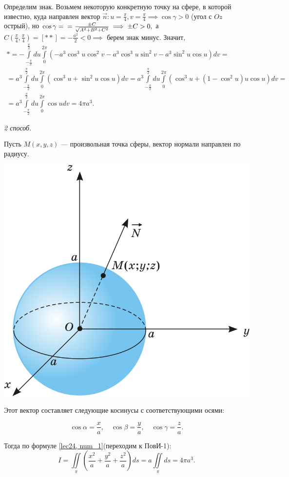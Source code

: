 \documentclass[../../main.tex]{subfiles}
\begin{document}
\begin{example}
	Определим знак. Возьмем некоторую конкретную точку на сфере, в которой 
	известно, куда направлен вектор $\vec{n}: u=\frac{\pi}{4}, v=\frac{\pi}{4}
	\implies \cos\gamma > 0$ (угол с $Oz$ острый), но $\cos\gamma =\\= 
	\frac{\pm C}{\sqrt{A^2 + B^2 + C^2}}\implies \pm C>0,$ а $C\left(\frac{\pi}
	{4}, \frac{\pi}{4}\right)=\left[**\right]=-\frac{a^2}{2}<0\implies$ берем
	 знак минус. Значит,
	\begin{multline*}*=-\int\limits_{-\frac{\pi}{2}}^{\frac{\pi}{2}}du\int
	\limits_0^{2\pi}(-a^3\cos^3 u \cos^2 v - a^3\cos^3 u \sin^2 v - a^3\sin^2
	 u \cos u)dv =\\= a^3 \int\limits_{-\frac{\pi}{2}}^{\frac{\pi}{2}}du\int
	 \limits_0^{2\pi}(\cos^3 u + \sin^2 u \cos u)dv = a^3 \int\limits_{-\frac
	 	{\pi}{2}}^{\frac{\pi}{2}}du\int\limits_0^{2\pi}(\cos^3 u + (1-\cos^2 u)
 	 u \cos u)dv = \\ = a^3 \int\limits_{-\frac{\pi}{2}}^{\frac{\pi}{2}}du\int
 	 \limits_0^{2\pi}\cos u dv = 4\pi a^3.\end{multline*}
	
	\emph{2 способ.}
		
	Пусть $M(x, y, z)$ --- произвольная точка сферы, вектор нормали направлен 
	по радиусу.
	
	\begin{center}
		\includegraphics[scale = 0.27]{lec24_1.jpg}
	\end{center}
	
	Этот вектор составляет следующие косинусы с соответствующими осями:
	
	\[\cos\alpha=\frac{x}{a},\quad \cos\beta=\frac{y}{a},\quad \cos\gamma=
	\frac{z}{a}.\]
	
	 Тогда по формуле \eqref{lec24, num_1}(переходим к ПовИ-1):
	\[I=\iint\limits_\pi\left(\frac{x^2}{a} + \frac{y^2}{a} +
	 \frac{z^2}{a}\right)ds = a \iint\limits_\pi ds = 4\pi a^3.\]
\end{example}
\end{document}
